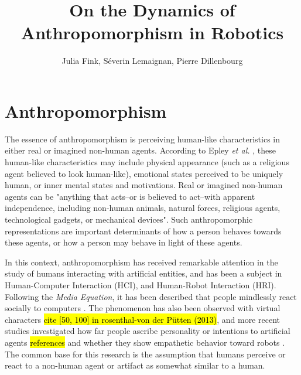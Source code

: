 \documentclass[lettersize, apacite, twoside, HRI]{apa_HRI}
\title{On the Dynamics of Anthropomorphism in Robotics
}
\author{Julia Fink, Séverin Lemaignan, Pierre Dillenbourg}
\affiliation{ Computer-Human Interaction in Learning and Instruction (CHILI) \\
              Ecole Polytechnique Fédérale de Lausanne (EPFL) \\
              CH-1015 Lausanne, Switzerland
}
\begin{document}
\maketitle


%
%
%
%
%
%


\section{Anthropomorphism}
\label{sec:intro}


	The essence of anthropomorphism is perceiving human-like characteristics in either real or imagined non-human agents. According to Epley \textit{et al.} \cite{epley_when_2008}, these human-like characteristics may include physical appearance (such as a religious agent believed to look human-like), emotional states perceived to be uniquely human, or inner mental states and motivations. Real or imagined non-human agents can be "anything that acts--or is believed to act--with apparent independence, including non-human animals, natural forces, religious agents, technological gadgets, or mechanical devices". Such anthropomorphic representations are important determinants of how a person behaves towards these agents, or how a person may behave in light of these agents.

	
	In this context, anthropomorphism has received remarkable attention in the study of humans interacting with artificial entities, and has been a subject in Human-Computer Interaction (HCI), and Human-Robot Interaction (HRI). Following the \textit{Media Equation}, it has been described that people mindlessly react socially to computers \cite{reeves_media_1996}. The phenomenon has also been observed with virtual characters \hl{cite [50, 100] in rosenthal-von der P{\"u}tten (2013)}, and more recent studies investigated how far people ascribe personality or intentions to artificial agents \hl{references} and whether they show empathetic behavior toward robots \cite{rosenthal-vonderputten_experimental_2013}. The common base for this research is the assumption that humans perceive or react to a non-human agent or artifact as somewhat similar to a human.
	
\end{document}
